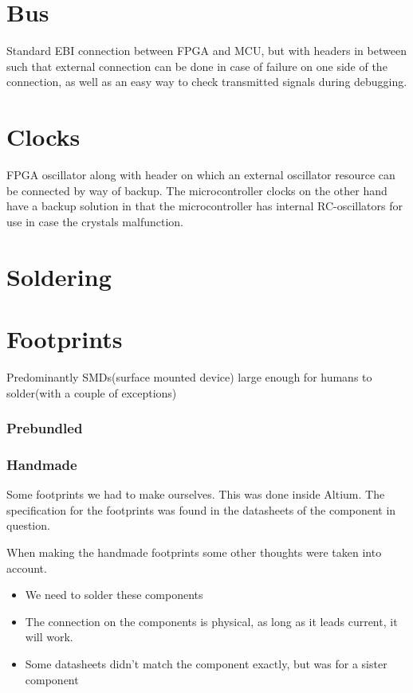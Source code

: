 \section{Bus}
Standard EBI connection between FPGA and MCU, but with headers in between such that external connection can be done in case of failure on one side of the connection, as well as an easy way to check transmitted signals during debugging.

\section{Clocks}
FPGA oscillator along with header on which an external oscillator resource can be connected by way of backup.
The microcontroller clocks on the other hand have a backup solution in that the microcontroller has internal RC-oscillators for use in case the crystals malfunction.

\section{Soldering}



\section{Footprints}
Predominantly SMDs(surface mounted device) large enough for humans to solder(with a couple of exceptions)




\subsubsection{Prebundled}

\subsubsection{Handmade}
Some footprints we had to make ourselves.
This was done inside Altium.
The specification for the footprints was found in the datasheets of the component in question.

When making the handmade footprints some other thoughts were taken into account.

\begin{itemize}
    \item We need to solder these components
    \item The connection on the components is physical, as long as it leads current, it will work.
    \item Some datasheets didn't match the component exactly, but was for a sister component
\end{itemize}

